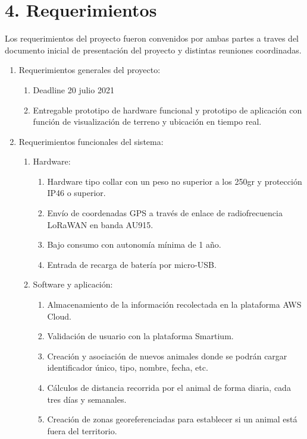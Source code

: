 \documentclass[11pt]{charter}
\begin{document}
\section{4. Requerimientos}
\label{sec:requerimientos}

Los requerimientos del proyecto fueron convenidos por ambas partes a traves del documento inicial de presentación del proyecto y distintas reuniones coordinadas. 


\begin{enumerate}
\item Requerimientos generales del proyecto:
	\begin{enumerate}
	\item Deadline 20 julio 2021
	\item Entregable prototipo de hardware funcional y prototipo de aplicación con función de visualización de terreno y ubicación en tiempo real. 
	\end{enumerate}
\item Requerimientos funcionales del sistema:
	\begin{enumerate}
	\item Hardware:
		\begin{enumerate}
		\item Hardware tipo collar con un peso no superior a los 250gr y protección IP46 o superior.
		\item Envío de coordenadas GPS a través de enlace de radiofrecuencia LoRaWAN en banda AU915.
		\item Bajo consumo con autonomía mínima de 1 año.
		\item Entrada de recarga de batería por micro-USB.
		\end{enumerate}
	\item Software y aplicación:
		\begin{enumerate}
		\item Almacenamiento de la información recolectada en la plataforma AWS Cloud.
		\item Validación de usuario con la plataforma Smartium.
		\item Creación y asociación de nuevos animales donde se podrán cargar identificador único, tipo, nombre, fecha, etc.
		\item Cálculos de distancia recorrida por el animal de forma diaria, cada tres días y semanales.
		\item Creación de zonas georeferenciadas para establecer si un animal está fuera del territorio.

\end{enumerate}
\end{enumerate}
\end{enumerate}
\end{document}
